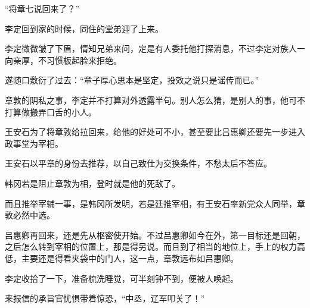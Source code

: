 “将章七说回来了？”

李定回到家的时候，同住的堂弟迎了上来。

李定微微皱了下眉，情知兄弟来问，定是有人委托他打探消息，不过李定对族人一向亲厚，不习惯板起脸来拒绝。

遂随口敷衍了过去：“章子厚心思本是坚定，投效之说只是谣传而已。”

章敦的阴私之事，李定并不打算对外透露半句。别人怎么猜，是别人的事，他可不打算做搬弄口舌的小人。

王安石为了将章敦给拉回来，给他的好处可不小，甚至要比吕惠卿还要先一步进入政事堂为宰相。

王安石以平章的身份去推荐，以自己致仕为交换条件，不愁太后不答应。

韩冈若是阻止章敦为相，登时就是他的死敌了。

而且推举宰辅一事，是韩冈所发明，若是廷推宰相，有王安石率新党众人同举，章敦必然中选。

吕惠卿再回来，还是先从枢密使开始。不过吕惠卿如今在外，第一目标还是回朝，之后怎么转到宰相的位置上，那是得另说。而且到了相当的地位上，手上的权力高低，主要还是得看夹袋中的门人，这一点，章敦远布如吕惠卿。

李定收拾了一下，准备梳洗睡觉，可半刻钟不到，便被人唤起。

来报信的承旨官忧惧带着惊恐，“中丞，辽军叩关了！”
